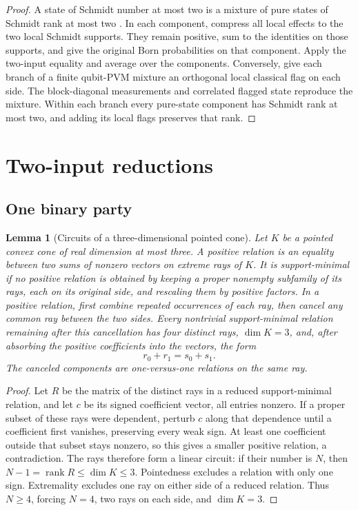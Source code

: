 \documentclass[11pt]{article}
\newtheorem{lemma}[theorem]{Lemma}
\theoremstyle{definition}
\newcommand{\rank}{\operatorname{rank}}
\begin{document}
\begin{proof}
A state of Schmidt number at most two is a mixture of pure states of
Schmidt rank at most two \cite{terhal2000schmidt}. In each component, compress all local effects to
the two local Schmidt supports. They remain positive, sum to the identities
on those supports, and give the original Born probabilities on that
component. Apply the two-input equality and average over the components.
Conversely, give each branch of a finite qubit-PVM mixture an orthogonal
local classical flag on each side. The block-diagonal measurements and
correlated flagged state reproduce the mixture. Within each branch every
pure-state component has Schmidt rank at most two, and adding its local
flags preserves that rank.
\end{proof}

\section{Two-input reductions}
\label{sec:reductions}

\subsection{One binary party}

\begin{lemma}[Circuits of a three-dimensional pointed cone]
\label{lem:lorentz-circuit}
Let \(K\) be a pointed convex cone of real dimension at most three.
A \emph{positive relation} is an equality between two sums of nonzero
vectors on extreme rays of \(K\). It is \emph{support-minimal} if no
positive relation is obtained by keeping a proper nonempty subfamily of
its rays, each on its original side, and rescaling them by positive
factors.
In a positive relation, first combine
repeated occurrences of each ray, then cancel any common ray between the
two sides. Every nontrivial support-minimal relation remaining
after this cancellation has four distinct rays, \(\dim K=3\), and, after
absorbing the positive coefficients into the vectors, the form
\[
r_0+r_1=s_0+s_1.
\]
The canceled components are one-versus-one relations on the same ray.
\end{lemma}

\begin{proof}
Let \(R\) be the matrix of the distinct rays in a reduced support-minimal
relation, and let \(c\) be its signed coefficient vector, all entries
nonzero. If a proper subset of these rays were dependent, perturb \(c\)
along that dependence until a coefficient first vanishes, preserving every
weak sign. At least one coefficient outside that subset stays nonzero,
so this gives a smaller positive relation, a contradiction. The rays
therefore form a linear circuit: if their number is \(N\), then
\(N-1=\rank R\le\dim K\le3\).
Pointedness excludes a relation with only one sign. Extremality excludes
one ray on either side of a reduced relation. Thus \(N\ge4\), forcing
\(N=4\), two rays on each side, and \(\dim K=3\).
\end{proof}
\end{document}
